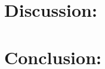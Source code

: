 \documentclass{article}
\begin{document}
\section*{Discussion:}
\doublespace


  
  


\singlespace
\newpage

\section*{Conclusion:}

\end{document}
